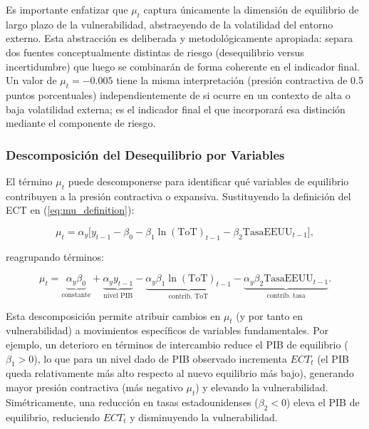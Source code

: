 \documentclass[3p,11pt,draft,natbib=false]{elsarticle}
\begin{document}
Es importante enfatizar que $\mu_t$ captura únicamente la dimensión de equilibrio de largo plazo de la vulnerabilidad, abstraeyendo de la volatilidad del entorno externo. Esta abstracción es deliberada y metodológicamente apropiada: separa dos fuentes conceptualmente distintas de riesgo (desequilibrio versus incertidumbre) que luego se combinarán de forma coherente en el indicador final. Un valor de $\mu_t = -0.005$ tiene la misma interpretación (presión contractiva de 0.5 puntos porcentuales) independientemente de si ocurre en un contexto de alta o baja volatilidad externa; es el indicador final el que incorporará esa distinción mediante el componente de riesgo.

\subsubsection{Descomposición del Desequilibrio por Variables}

El término $\mu_t$ puede descomponerse para identificar qué variables de equilibrio contribuyen a la presión contractiva o expansiva. Sustituyendo la definición del ECT en (\ref{eq:mu_definition}):

\begin{equation}
\mu_t = \alpha_y \Big[ y_{t-1} - \beta_0 - \beta_1 \ln(\text{ToT})_{t-1} - \beta_2 \text{TasaEEUU}_{t-1} \Big],
\label{eq:mu_decomposition}
\end{equation}

reagrupando términos:

\begin{equation}
\mu_t = \underbrace{\alpha_y \beta_0}_{\text{constante}} + \underbrace{\alpha_y y_{t-1}}_{\text{nivel PIB}} - \underbrace{\alpha_y \beta_1 \ln(\text{ToT})_{t-1}}_{\text{contrib. ToT}} - \underbrace{\alpha_y \beta_2 \text{TasaEEUU}_{t-1}}_{\text{contrib. tasa}}.
\label{eq:mu_contributions}
\end{equation}

Esta descomposición permite atribuir cambios en $\mu_t$ (y por tanto en vulnerabilidad) a movimientos específicos de variables fundamentales. Por ejemplo, un deterioro en términos de intercambio reduce el PIB de equilibrio ($\beta_1 > 0$), lo que para un nivel dado de PIB observado incrementa $ECT_t$ (el PIB queda relativamente más alto respecto al nuevo equilibrio más bajo), generando mayor presión contractiva (más negativo $\mu_t$) y elevando la vulnerabilidad. Simétricamente, una reducción en tasas estadounidenses ($\beta_2 < 0$) eleva el PIB de equilibrio, reduciendo $ECT_t$ y disminuyendo la vulnerabilidad.
\end{document}
